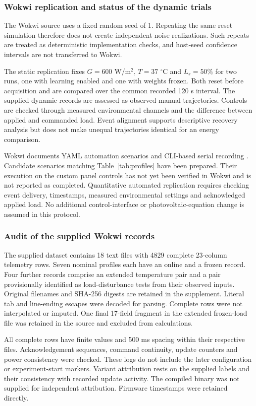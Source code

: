 \documentclass[Acad.Energy.,researcharticle,9pt,twoside,oneauthor]{Definitions/jams_academia}
\begin{document}
\subsubsection{Wokwi replication and status of the dynamic trials}
The Wokwi source uses a fixed random seed of 1. Repeating the same reset simulation therefore does not create independent noise realizations. Such repeats are treated as deterministic implementation checks, and host-seed confidence intervals are not transferred to Wokwi.

The static replication fixes $G=600$ W/m$^2$, $T=37$ $^\circ$C and $L_s=50\%$ for two runs, one with learning enabled and one with weights frozen. Both reset before acquisition and are compared over the common recorded 120 s interval. The supplied dynamic records are assessed as observed manual trajectories. Controls are checked through measured environmental channels and the difference between applied and commanded load. Event alignment supports descriptive recovery analysis but does not make unequal trajectories identical for an energy comparison.

Wokwi documents YAML automation scenarios and CLI-based serial recording \cite{wokwiautomation,wokwicli}. Candidate scenarios matching Table~\ref{tab:profiles} have been prepared. Their execution on the custom panel controls has not yet been verified in Wokwi and is not reported as completed. Quantitative automated replication requires checking event delivery, timestamps, measured environmental settings and acknowledged applied load. No additional control-interface or photovoltaic-equation change is assumed in this protocol.

\subsubsection{Audit of the supplied Wokwi records}
The supplied dataset contains 18 text files with 4829 complete 23-column telemetry rows. Seven nominal profiles each have an online and a frozen record. Four further records comprise an extended temperature pair and a pair provisionally identified as load-disturbance tests from their observed inputs. Original filenames and SHA-256 digests are retained in the supplement. Literal tab and line-ending escapes were decoded for parsing. Complete rows were not interpolated or imputed. One final 17-field fragment in the extended frozen-load file was retained in the source and excluded from calculations.

All complete rows have finite values and 500 ms spacing within their respective files. Acknowledgement sequences, command continuity, update counters and power consistency were checked. These logs do not include the later configuration or experiment-start markers. Variant attribution rests on the supplied labels and their consistency with recorded update activity. The compiled binary was not supplied for independent attribution. Firmware timestamps were retained directly.
\end{document}
